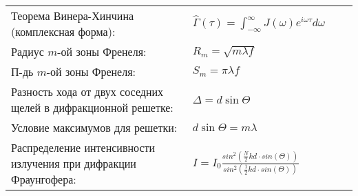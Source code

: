 \documentclass{article}
\begin{document}
\begin{tabular}{ |p{4.2cm}|p{5.3cm}|p{6cm}|p{3.5cm}|  }
                                                                             &  %
                                                                             \\ %
\hline
Теорема Винера-Хинчина (комплексная форма):                                  &  %
$\hat{\Gamma}(\tau) =
 \int_{-\infty}^{\infty} J(\omega) e^{i \omega \tau} d\omega$                &  %
                                                                             &  %
                                                                             \\ %
\hline
Радиус $m$-ой зоны Френеля:                                                  &  %
$R_m = \sqrt{m \lambda f}$                                                   &  %
                                                                             &  %
                                                                             \\ %
\hline
П-дь $m$-ой зоны Френеля:                                                    &  %
$S_m = \pi \lambda f$                                                        &  %
                                                                             &  %
                                                                             \\ %
\hline
Разность хода от двух соседних щелей в дифракционной решетке:                &  %
$\Delta = d \sin \Theta$                                                     &  %
                                                                             &  %
                                                                             \\ %
\hline
Условие максимумов для решетки:                                              &  %
$d \sin \Theta = m \lambda$                                                  &  %
                                                                             &  %
                                                                             \\ %
\hline
Распределение интенсивности излучения при дифракции Фраунгофера:             &  %
$I = I_0 \frac{sin^2(\frac{N}{2} kd \cdot sin(\Theta))}
              {sin^2(\frac{1}{2} kd \cdot sin(\Theta))}$                                             &  %
                                                                             &  %

\end{tabular}
\end{document}
